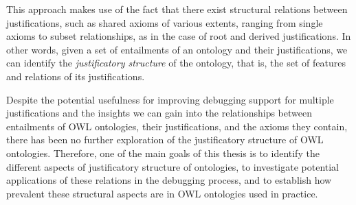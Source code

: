 This approach makes use of the fact that there exist structural relations between justifications, such as shared axioms of various extents, ranging from single axioms to subset relationships, as in the case of root and derived justifications. In other words, given a set of entailments of an ontology and their justifications, we can identify the \emph{justificatory structure} of the ontology, that is, the set of features and relations of its justifications. 

Despite the potential usefulness for improving debugging support for multiple justifications and the insights we can gain into the relationships between entailments of OWL ontologies, their justifications, and the axioms they contain, there has been no further exploration of the justificatory structure of OWL ontologies. Therefore, one of the main goals of this thesis is to identify the different aspects of justificatory structure of ontologies, to investigate potential applications of these relations in the debugging process, and to establish how prevalent these structural aspects are in OWL ontologies used in practice.

